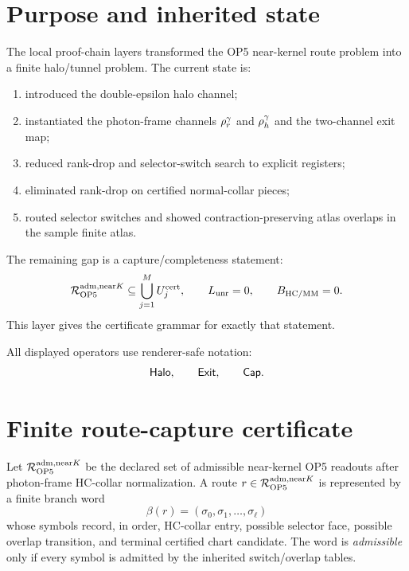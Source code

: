 \section{Purpose and inherited state}

The local proof-chain layers transformed the OP5 near-kernel route problem into a finite halo/tunnel problem. The current state is:
\begin{enumerate}[label=(\roman*)]
\item introduced the double-epsilon halo channel;
\item instantiated the photon-frame channels \(\rho_{r}^{\gamma}\) and \(\rho_{h}^{\gamma}\) and the two-channel exit map;
\item reduced rank-drop and selector-switch search to explicit registers;
\item eliminated rank-drop on certified normal-collar pieces;
\item routed selector switches and showed contraction-preserving atlas overlaps in the sample finite atlas.
\end{enumerate}
The remaining gap is a capture/completeness statement:
\[
\mathcal R_{\mathrm{OP} 5}^{\mathrm{adm},\mathrm{near} K}
\subseteq
\bigcup_{j=1}^{M} U_j^{\mathrm{cert}},
\qquad
L_{\mathrm{unr}}=0,
\qquad
B_{\mathrm{HC}/\mathrm{MM}}=0 .
\]
This layer gives the certificate grammar for exactly that statement.

All displayed operators use renderer-safe notation:
\[
\mathsf{Halo},
\qquad
\mathsf{Exit},
\qquad
\mathsf{Cap} .
\]

\section{Finite route-capture certificate}

\begin{definition}
Let \(\mathcal R_{\mathrm{OP} 5}^{\mathrm{adm},\mathrm{near} K}\) be the declared set of admissible near-kernel OP5 readouts after photon-frame HC-collar normalization. A route \(r\in\mathcal R_{\mathrm{OP} 5}^{\mathrm{adm},\mathrm{near} K}\) is represented by a finite branch word
\[
\beta(r)=(\sigma_0,\sigma_1,\ldots,\sigma_\ell)
\]
whose symbols record, in order, HC-collar entry, possible selector face, possible overlap transition, and terminal certified chart candidate. The word is \emph{admissible} only if every symbol is admitted by the inherited switch/overlap tables.
\end{definition}

